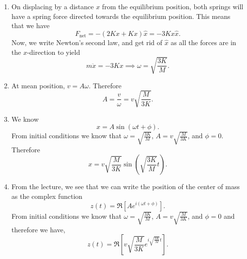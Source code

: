 \begin{sol}
\begin{enumerate}[label=\textbf{(\alph*)}]
\item On displacing by a distance $x$ from the equilibrium position, both springs will have a spring force directed towards the equilibrium position. This means that we have $$F_{\text{net}}= -(2Kx + Kx)\hat{x} = -3Kx\hat{x}.$$ 
Now, we write Newton's second law, and get rid of $\hat{x}$ as all the forces are in the $x$-direction to yield
\[m\ddot{x} = -3Kx\implies \omega = \boxed{\sqrt{\frac{3K}{M}}}.\]
\item At mean position, $v = A\omega $. Therefore 
\[A= \frac{v}{\omega} = \boxed{{v}\sqrt{\frac{M}{3K}}}.\]
\item We know $$x = A \sin (\omega t + \phi).$$ From initial conditions we know that $\omega = \sqrt{\frac{3K}{M}}$, $A={v}\sqrt{\frac{M}{3K}}$, and $\phi = 0$. Therefore 
$$ x = \boxed{v\sqrt {\frac {M}{3K}} \sin \left( \sqrt {\frac{3K}{M}} t \right)}.$$
\item From the lecture, we see that we can write the position of the center of mass as the complex function 
\[z (t) = \Re \left[Ae^{i (\omega t + \phi)}\right].\]
From initial conditions we know that $\omega = \sqrt{\frac{3K}{M}}$, $A=v\sqrt{\frac{M}{3K}}$, and $\phi = 0$ and therefore we have,
\[z(t) = \boxed{\Re \left[v\sqrt{\frac{M}{3K}}e^{i\sqrt{\frac{3K}{M}}t}\right]}.\]
\end{enumerate}
\end{sol}